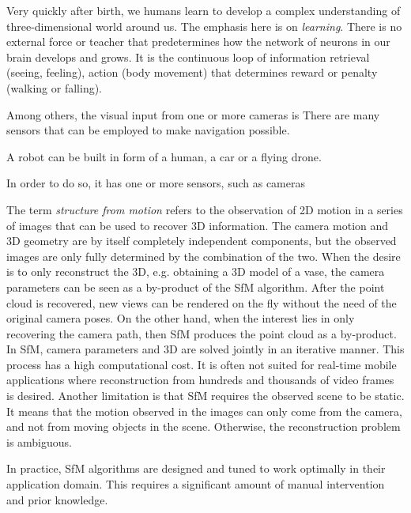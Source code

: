 		Very quickly after birth, we humans learn to develop a complex understanding of three-dimensional world around us. 
		The emphasis here is on \emph{learning}.
		There is no external force or teacher that predetermines how the network of neurons in our brain develops and grows.
		It is the continuous loop of information retrieval (seeing, feeling), action (body movement) that determines reward or penalty (walking or falling).
		
		
		
		Among others, the visual input from one or more cameras is 
		There are many sensors that can be employed to make navigation possible. 
		
		A robot can be built in form of a human, a car or a flying drone.
		
		In order to do so, it has one or more sensors, such as cameras
		
		The term \emph{structure from motion} refers to the observation of 2D motion in a series of images that can be used to recover 3D information.
		The camera motion and 3D geometry are by itself completely independent components, but the observed images are only fully determined by the combination of the two.
		When the desire is to only reconstruct the 3D, e.g. obtaining a 3D model of a vase, the camera parameters can be seen as a by-product of the SfM algorithm. 
		After the point cloud is recovered, new views can be rendered on the fly without the need of the original camera poses.
		On the other hand, when the interest lies in only recovering the camera path, then SfM produces the point cloud as a by-product.
		In SfM, camera parameters and 3D are solved jointly in an iterative manner.
		This process has a high computational cost.
		It is often not suited for real-time mobile applications where reconstruction from hundreds and thousands of video frames is desired.
		Another limitation is that SfM requires the observed scene to be static.
		It means that the motion observed in the images can only come from the camera, and not from moving objects in the scene.
		Otherwise, the reconstruction problem is ambiguous.
		
		In practice, SfM algorithms are designed and tuned to work optimally in their application domain.
		This requires a significant amount of manual intervention and prior knowledge.
		
